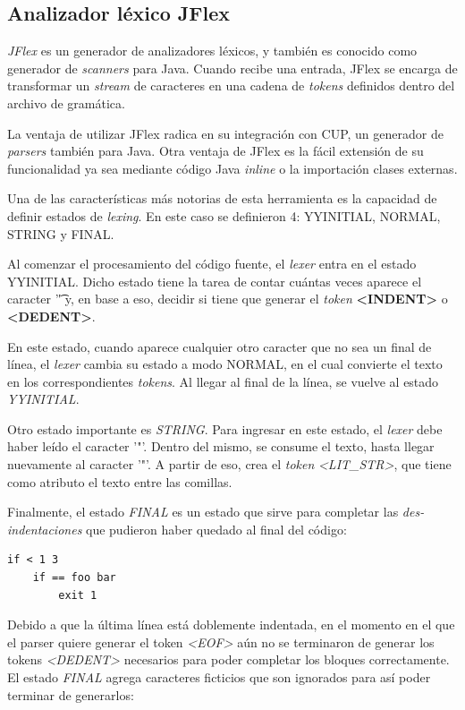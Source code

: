 \documentclass{article}
\begin{document}
        \subsection{Analizador léxico JFlex}
             \textit{JFlex} es un generador de analizadores léxicos, y también es conocido como generador de \textit{scanners} para Java. Cuando recibe una entrada, JFlex se encarga de transformar un \textit{stream} de caracteres en una cadena de \textit{tokens} definidos dentro del archivo de gramática.
            \par La ventaja de utilizar JFlex radica en su integración con CUP, un generador de \textit{parsers} también para Java. Otra ventaja de JFlex es la fácil extensión de su funcionalidad ya sea mediante código Java \textit{inline} o la importación clases externas.
            \\
            \par Una de las características más notorias de esta herramienta es la capacidad de definir estados de \textit{lexing}. En este caso se definieron 4: YYINITIAL, NORMAL, STRING y FINAL.
            \par Al comenzar el procesamiento del código fuente, el \textit{lexer} entra en el estado YYINITIAL. Dicho estado tiene la tarea de contar cuántas veces aparece el caracter '\t' y, en base a eso, decidir si tiene que generar el \textit{token} \textbf{<INDENT>} o \textbf{<DEDENT>}.
            \par En este estado, cuando aparece cualquier otro caracter que no sea un final de línea, el \textit{lexer} cambia su estado a modo NORMAL, en el cual convierte el texto en los correspondientes \textit{tokens}. Al llegar al final de la línea, se vuelve al estado \textit{YYINITIAL}.
            \par Otro estado importante es \textit{STRING}. Para ingresar en este estado, el \textit{lexer} debe haber leído el caracter '"'. Dentro del mismo, se consume el texto, hasta llegar nuevamente al caracter '"'. A partir de eso, crea el \textit{token} \textit{<LIT\_STR>}, que tiene como atributo el texto entre las comillas.
            \par Finalmente, el estado \textit{FINAL} es un estado que sirve para completar las \textit{des-indentaciones} que pudieron haber quedado al final del código:
            \begin{lstlisting}
if < 1 3
    if == foo bar
        exit 1
            \end{lstlisting}
            Debido a que la última línea está doblemente indentada, en el momento en el que el parser quiere generar el token \textit{<EOF>} aún no se terminaron de generar los tokens \textit{<DEDENT>} necesarios para poder completar los bloques correctamente. El estado \textit{FINAL} agrega caracteres ficticios que son ignorados para así poder terminar de generarlos:
\end{document}
